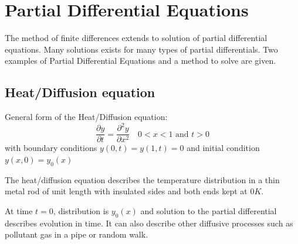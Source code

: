 \documentclass[10pt,a4paper]{article}
\begin{document}
\section{Partial Differential Equations}

The method of finite differences extends to solution of partial differential equations. Many
solutions exists for many types of partial differentials. Two examples of Partial Differential
Equations and a method to solve are given.

\subsection{Heat/Diffusion equation}

\begin{tcolorbox}[breakable,colback=white,colframe=black,width=\dimexpr\textwidth+12mm\relax,enlarge left by=-6mm]
General form of the Heat/Diffusion equation:
$$
    \frac{\partial y}{\partial t} = \frac{\partial ^2y}{\partial x^2} \quad 0<x<1 \text{ and } t>0
$$
with boundary conditions $y(0,t)=y(1,t)=0$ and initial condition $y(x,0)=y_0(x)$
\end{tcolorbox}

The heat/diffusion equation describes the temperature distribution in a thin metal rod of unit
length with insulated sides and both ends kept at $0K$. \par 

At time $t=0$, distribution is $y_0(x)$ and solution to the partial differential describes evolution
in time. It can also describe other diffusive processes such as pollutant gas in a pipe or random
walk. \par 
\end{document}
